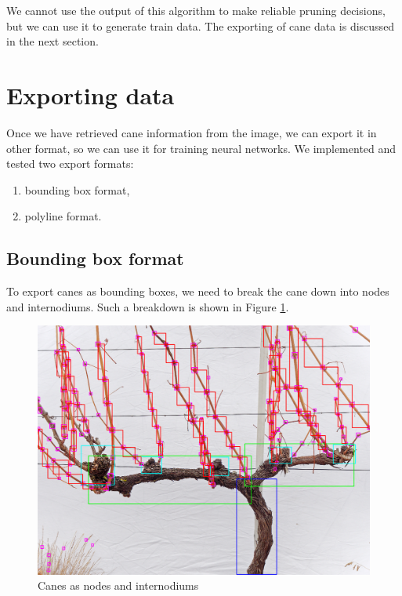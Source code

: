 \documentclass{PSAIE}%
\begin{document}
We cannot use the output of this algorithm to make reliable pruning decisions, but we can use it to generate
train data. The exporting of cane data is discussed in the next section.

\section{Exporting data} \label{sec_exporting_data}
Once we have retrieved cane information from the image, we can export it in other format, so we can use it for
training neural networks. We implemented and tested two export formats:

\begin{enumerate}
      \item bounding box format,
      \item polyline format.
\end{enumerate}

\subsection{Bounding box format} \label{sec_export_bounding_box_format}
To export canes as bounding boxes, we need to break the cane down into nodes and internodiums. Such a
breakdown is shown in Figure \ref{fig_internodium_boxes}.

\begin{figure}[h]
      \centering
      \includegraphics[scale=0.28]{images/internodium_boxes.png}
      \caption{Canes as nodes and internodiums}
      \label{fig_internodium_boxes}
\end{figure}
\end{document}
